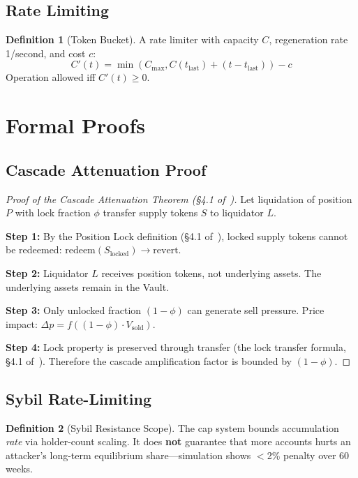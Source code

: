 \documentclass[10pt,a4paper,twocolumn]{article}
\theoremstyle{definition}
\newtheorem{definition}{Definition}[section]
\theoremstyle{plain}
\theoremstyle{remark}
\begin{document}
\subsection{Rate Limiting}

\begin{definition}[Token Bucket]
A rate limiter with capacity $C$, regeneration rate 1/second, and cost $c$:
\begin{equation}
C'(t) = \min\left(C_{\max}, C(t_{\text{last}}) + (t - t_{\text{last}})\right) - c
\end{equation}
Operation allowed iff $C'(t) \geq 0$.
\end{definition}

\section{Formal Proofs}
\label{apx:proofs}

\subsection{Cascade Attenuation Proof}

\begin{proof}[Proof of the Cascade Attenuation Theorem (\S4.1 of~\cite{wp})]
Let liquidation of position $P$ with lock fraction $\phi$ transfer supply tokens $S$ to liquidator $L$.

\textbf{Step 1:} By the Position Lock definition (\S4.1 of~\cite{wp}), locked supply tokens cannot be redeemed: $\text{redeem}(S_{\text{locked}}) \to \text{revert}$.

\textbf{Step 2:} Liquidator $L$ receives position tokens, not underlying assets. The underlying assets remain in the Vault.

\textbf{Step 3:} Only unlocked fraction $(1{-}\phi)$ can generate sell pressure. Price impact: $\Delta p = f((1{-}\phi) \cdot V_{\text{sold}})$.

\textbf{Step 4:} Lock property is preserved through transfer (the lock transfer formula, \S4.1 of~\cite{wp}). Therefore the cascade amplification factor is bounded by $(1{-}\phi)$.
\end{proof}

\subsection{Sybil Rate-Limiting}

\begin{definition}[Sybil Resistance Scope]
\label{def:sybil-scope}
The cap system bounds accumulation \emph{rate} via holder-count scaling. It does \textbf{not} guarantee that more accounts hurts an attacker's long-term equilibrium share---simulation shows $<$2\% penalty over 60 weeks.
\end{definition}
\end{document}
